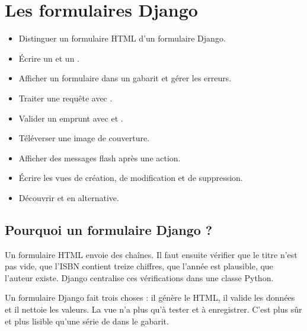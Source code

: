 \chapter{Les formulaires Django}
\label{ch:formulaires}


\begin{objectifs}
\begin{itemize}
  \item Distinguer un formulaire HTML d'un formulaire Django.
  \item Écrire un  et un .
  \item Afficher un formulaire dans un gabarit et gérer les erreurs.
  \item Traiter une requête  avec .
  \item Valider un emprunt avec  et .
  \item Téléverser une image de couverture.
  \item Afficher des messages flash après une action.
  \item Écrire les vues de création, de modification et de suppression.
  \item Découvrir  et  en alternative.
\end{itemize}
\end{objectifs}

\section{Pourquoi un formulaire Django ?}

Un formulaire HTML envoie des chaînes. Il faut ensuite vérifier que le titre n'est
pas vide, que l'ISBN contient treize chiffres, que l'année est plausible, que
l'auteur existe. Django centralise ces vérifications dans une classe Python.

\begin{retenir}
Un formulaire Django fait trois choses : il génère le HTML, il valide les données et
il nettoie les valeurs. La vue n'a plus qu'à tester  et à
enregistrer. C'est plus sûr et plus lisible qu'une série de  dans le
gabarit.
\end{retenir}

